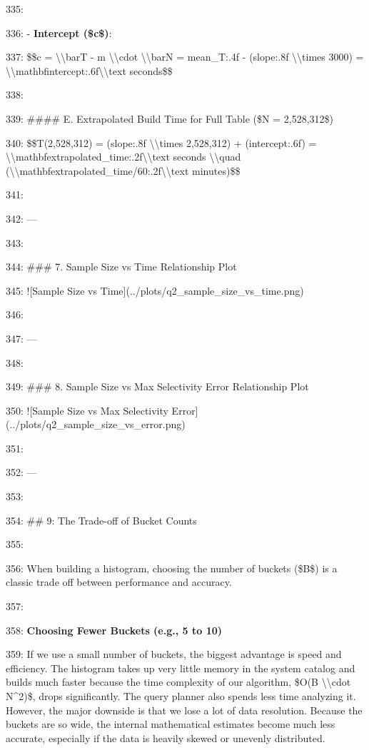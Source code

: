 \documentclass[11pt,a4paper]{article}
\begin{document}
{335:

336: - \textbf{Intercept (\$c\$)}:

337:   \$\$c = \textbackslash{}\textbackslash{}bar{{T}} - m \textbackslash{}\textbackslash{}cdot \textbackslash{}\textbackslash{}bar{{N}} = {mean\_T:.4f} - ({slope:.8f} \textbackslash{}\textbackslash{}times 3000) = \textbackslash{}\textbackslash{}mathbf{{{intercept:.6f}\textbackslash{}\textbackslash{}text{{ seconds}}}}\$\$

338:

339: \#\#\#\# E. Extrapolated Build Time for Full Table (\$N = 2,528,312\$)

340: \$\$T(2,528,312) = ({slope:.8f} \textbackslash{}\textbackslash{}times 2,528,312) + ({intercept:.6f}) = \textbackslash{}\textbackslash{}mathbf{{{extrapolated\_time:.2f}\textbackslash{}\textbackslash{}text{{ seconds}}}} \textbackslash{}\textbackslash{}quad (\textbackslash{}\textbackslash{}mathbf{{{extrapolated\_time/60:.2f}\textbackslash{}\textbackslash{}text{{ minutes}}}})\$\$

341:

342: ---

343:

344: \#\#\# 7. Sample Size vs Time Relationship Plot

345: ![Sample Size vs Time](../plots/q2\_sample\_size\_vs\_time.png)

346:

347: ---

348:

349: \#\#\# 8. Sample Size vs Max Selectivity Error Relationship Plot

350: ![Sample Size vs Max Selectivity Error](../plots/q2\_sample\_size\_vs\_error.png)

351:

352: ---

353:

354: \#\# 9: The Trade-off of Bucket Counts

355:

356: When building a histogram, choosing the number of buckets (\$B\$) is a classic trade off between performance and accuracy.

357:

358: \textbf{Choosing Fewer Buckets (e.g., 5 to 10)}

359: If we use a small number of buckets, the biggest advantage is speed and efficiency. The histogram takes up very little memory in the system catalog and builds much faster because the time complexity of our algorithm, \$O(B \textbackslash{}\textbackslash{}cdot N\textasciicircum{}2)\$, drops significantly. The query planner also spends less time analyzing it. However, the major downside is that we lose a lot of data resolution. Because the buckets are so wide, the internal mathematical estimates become much less accurate, especially if the data is heavily skewed or unevenly distributed.

}
\end{document}
